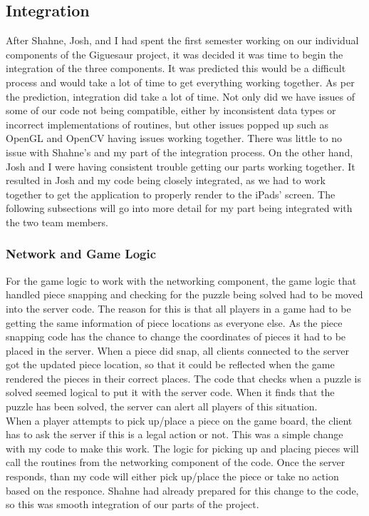 \documentclass{article}
\begin{document}
\subsection{Integration}
After Shahne, Josh, and I had spent the first semester working on our individual
components of the Giguesaur project, it was decided it was time to begin the
integration of the three components. It was predicted this would be a difficult
process and would take a lot of time to get everything working together. As per
the prediction, integration did take a lot of time. Not only did we have issues
of some of our code not being compatible, either by inconsistent data types or
incorrect implementations of routines, but other issues popped up such as OpenGL
and \gls{OpenCV} having issues working together. There was little to no issue with
Shahne's and my part of the integration process. On the other hand, Josh and I
were having consistent trouble getting our parts working together. It resulted
in Josh and my code being closely integrated, as we had to work together to get
the application to properly render to the iPads' screen. The following
subsections will go into more detail for my part being integrated with the two
team members.

\subsubsection{Network and Game Logic}
For the game logic to work with the networking component, the game logic that
handled piece snapping and checking for the puzzle being solved had to be moved
into the server code. The reason for this is that all players in a game had to
be getting the same information of piece locations as everyone else. As the
piece snapping code has the chance to change the coordinates of pieces it had to
be placed in the server. When a piece did snap, all clients connected to the
server got the updated piece location, so that it could be reflected when the
game rendered the pieces in their correct places. The code that checks when a
puzzle is solved seemed logical to put it with the server code. When it finds
that the puzzle has been solved, the server can alert all players of this
situation.\\

When a player attempts to pick up/place a piece on the game board, the client
has to ask the server if this is a legal action or not. This was a simple change
with my code to make this work. The logic for picking up and placing pieces will
call the routines from the networking component of the code. Once the server
responds, than my code will either pick up/place the piece or take no action
based on the responce. Shahne had already prepared for this change to the code,
so this was smooth integration of our parts of the project.\\
\end{document}
